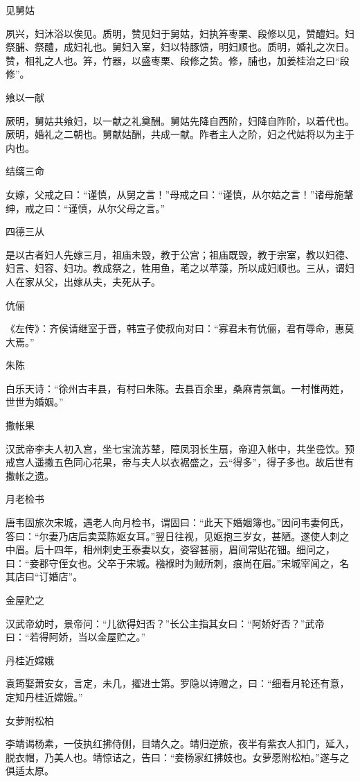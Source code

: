 \documentclass[a4paper,12pt,UTF8,twoside]{ctexbook}
\begin{document}
    见舅姑
    
    夙兴，妇沐浴以俟见。质明，赞见妇于舅姑，妇执笲枣栗、段修以见，赞醴妇。妇祭脯、祭醴，成妇礼也。舅妇入室，妇以特豚馈，明妇顺也。质明，婚礼之次日。赞，相礼之人也。笲，竹器，以盛枣栗、段修之贽。修，脯也，加姜桂治之曰“段修”。
    
    飨以一献
    
    厥明，舅姑共飨妇，以一献之礼奠酬。舅姑先降自西阶，妇降自阼阶，以着代也。厥明，婚礼之二朝也。舅献姑酬，共成一献。阼者主人之阶，妇之代姑将以为主于内也。
    
    结缡三命
    
    女嫁，父戒之曰：“谨慎，从舅之言！”母戒之曰：“谨慎，从尔姑之言！”诸母施鞶绅，戒之曰：“谨慎，从尔父母之言。”
    
    四德三从
    
    是以古者妇人先嫁三月，祖庙未毁，教于公宫；祖庙既毁，教于宗室，教以妇德、妇言、妇容、妇功。教成祭之，牲用鱼，芼之以苹藻，所以成妇顺也。三从，谓妇人在家从父，出嫁从夫，夫死从子。
    
    伉俪
    
    《左传》：齐侯请继室于晋，韩宣子使叔向对曰：“寡君未有伉俪，君有辱命，惠莫大焉。”
    
    朱陈
    
    白乐天诗：“徐州古丰县，有村曰朱陈。去县百余里，桑麻青氛氲。一村惟两姓，世世为婚姻。”
    
    撒帐果
    
    汉武帝李夫人初入宫，坐七宝流苏辇，障凤羽长生扇，帝迎入帐中，共坐卺饮。预戒宫人遥撒五色同心花果，帝与夫人以衣裾盛之，云“得多”，得子多也。故后世有撒帐之遗。
    
    月老检书
    
    唐韦固旅次宋城，遇老人向月检书，谓固曰：“此天下婚姻簿也。”因问韦妻何氏，答曰：“尔妻乃店后卖菜陈妪女耳。”翌日往视，见妪抱三岁女，甚陋。遂使人刺之中眉。后十四年，相州刺史王泰妻以女，姿容甚丽，眉间常贴花钿。细问之，曰：“妾郡守侄女也。父卒于宋城。襁褓时为贼所刺，痕尚在眉。”宋城宰闻之，名其店曰“订婚店”。
    
    金屋贮之
    
    汉武帝幼时，景帝问：“儿欲得妇否？”长公主指其女曰：“阿娇好否？”武帝曰：“若得阿娇，当以金屋贮之。”
    
    丹桂近嫦娥
    
    袁筠娶萧安女，言定，未几，擢进士第。罗隐以诗赠之，曰：“细看月轮还有意，定知丹桂近嫦娥。”
    
    女萝附松柏
    
    李靖谒杨素，一伎执红拂侍侧，目靖久之。靖归逆旅，夜半有紫衣人扣门，延入，脱衣帽，乃美人也。靖惊诘之，告曰：“妾杨家红拂妓也。女萝愿附松柏。”遂与之俱适太原。
    
\end{document}
